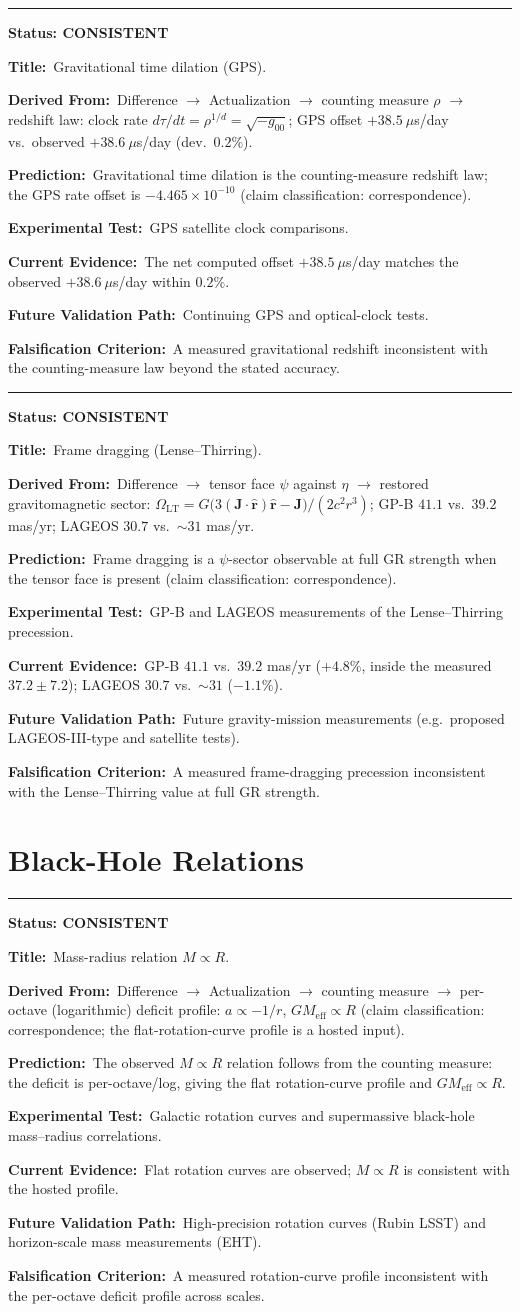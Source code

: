 \documentclass[11pt,a4paper]{article}
\newcommand{\predstart}[2]{%
  \par\medskip\noindent\hrule\par\smallskip
  \noindent{\large\bfseries #1}\hfill{\bfseries Status: #2}\par\smallskip
}
\newcommand{\pfield}[2]{%
  \noindent\textbf{#1:}~#2\par\smallskip
}
\begin{document}
\predstart{AT-P019}{CONSISTENT}
\pfield{Title}{Gravitational time dilation (GPS).}
\pfield{Derived From}{Difference $\to$ Actualization $\to$ counting measure $\rho$ $\to$
redshift law: clock rate $d\tau/dt = \rho^{1/d} = \sqrt{-g_{00}}$; GPS offset
$+38.5\ \mu$s/day vs.\ observed $+38.6\ \mu$s/day (dev.\ $0.2\%$).}
\pfield{Prediction}{Gravitational time dilation is the counting-measure redshift law; the
GPS rate offset is $-4.465\times10^{-10}$ (claim classification: correspondence).}
\pfield{Experimental Test}{GPS satellite clock comparisons.}
\pfield{Current Evidence}{The net computed offset $+38.5\ \mu$s/day matches the observed
$+38.6\ \mu$s/day within $0.2\%$.}
\pfield{Future Validation Path}{Continuing GPS and optical-clock tests.}
\pfield{Falsification Criterion}{A measured gravitational redshift inconsistent with the
counting-measure law beyond the stated accuracy.}

\predstart{AT-P020}{CONSISTENT}
\pfield{Title}{Frame dragging (Lense--Thirring).}
\pfield{Derived From}{Difference $\to$ tensor face $\psi$ against $\eta$ $\to$ restored
gravitomagnetic sector: $\Omega_{\mathrm{LT}} = G\bigl(3(\mathbf{J}\cdot\hat{\mathbf r})
\hat{\mathbf r}-\mathbf{J}\bigr)/(2c^2r^3)$; GP-B $41.1$ vs.\ $39.2$ mas/yr; LAGEOS $30.7$
vs.\ $\sim31$ mas/yr.}
\pfield{Prediction}{Frame dragging is a $\psi$-sector observable at full GR strength when
the tensor face is present (claim classification: correspondence).}
\pfield{Experimental Test}{GP-B and LAGEOS measurements of the Lense--Thirring precession.}
\pfield{Current Evidence}{GP-B $41.1$ vs.\ $39.2$ mas/yr ($+4.8\%$, inside the measured
$37.2\pm7.2$); LAGEOS $30.7$ vs.\ $\sim31$ ($-1.1\%$).}
\pfield{Future Validation Path}{Future gravity-mission measurements (e.g.\ proposed
LAGEOS-III-type and satellite tests).}
\pfield{Falsification Criterion}{A measured frame-dragging precession inconsistent with the
Lense--Thirring value at full GR strength.}

\section{Black-Hole Relations}
\label{sec:black-hole}

\predstart{AT-P021}{CONSISTENT}
\pfield{Title}{Mass-radius relation $M \propto R$.}
\pfield{Derived From}{Difference $\to$ Actualization $\to$ counting measure $\to$ per-octave
(logarithmic) deficit profile: $a \propto -1/r$, $GM_{\mathrm{eff}} \propto R$
(claim classification: correspondence; the flat-rotation-curve profile is a hosted input).}
\pfield{Prediction}{The observed $M \propto R$ relation follows from the counting measure:
the deficit is per-octave/log, giving the flat rotation-curve profile and
$GM_{\mathrm{eff}} \propto R$.}
\pfield{Experimental Test}{Galactic rotation curves and supermassive black-hole
mass--radius correlations.}
\pfield{Current Evidence}{Flat rotation curves are observed; $M \propto R$ is consistent
with the hosted profile.}
\pfield{Future Validation Path}{High-precision rotation curves (Rubin LSST) and horizon-scale
mass measurements (EHT).}
\pfield{Falsification Criterion}{A measured rotation-curve profile inconsistent with the
per-octave deficit profile across scales.}
\end{document}
